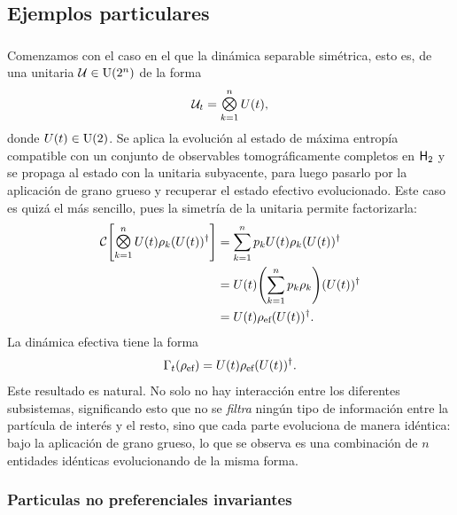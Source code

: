 \subsection{Ejemplos particulares}

\subsubsection{}

Comenzamos con el caso en el que la dinámica separable simétrica, esto es, de una unitaria $\mathcal{U}\in\text{U}(2^{n})$ de la forma
\begin{equation}
    \mcU_{t}=\Motimes_{k=1}^{n}U(t),\nonumber
\end{equation}
donde $U(t)\in\text{U}(2)$. Se aplica la evolución al estado de máxima entropía compatible con un conjunto de observables tomográficamente completos en ${\sf H}_{2}$ y se propaga al estado con la unitaria subyacente, para luego pasarlo por la aplicación de grano grueso y recuperar el estado efectivo evolucionado. Este caso es quizá el más sencillo, pues la simetría de la unitaria permite factorizarla:
\begin{align}
\mcC\qty[\Motimes_{k=1}^{n}U(t) \rho_{k} (U(t))^{\dag}]&=\sum_{k=1}^{n}p_{k} U(t) \rho_{k} (U(t))^{\dag}\nonumber \\
&=U(t)\qty(\sum_{k=1}^{n}p_{k} \rho_{k}) (U(t))^{\dag}\nonumber\\
&=U(t)\rho_{\ef}(U(t))^{\dag}.\nonumber
\end{align}
La dinámica efectiva tiene la forma
\begin{equation}
    \Gamma_{t}(\rho_{\text{ef}})=U(t)\rho_{\text{ef}}(U(t))^{\dag}.\nonumber
\end{equation}
Este resultado es natural. No solo no hay interacción entre los diferentes subsistemas, significando esto que no se \textit{filtra} ningún tipo de información entre la partícula de interés y el resto, sino que cada parte evoluciona de manera idéntica: bajo la aplicación de grano grueso, lo que se observa es una combinación de $n$ entidades idénticas evolucionando de la misma forma.

\subsubsection{Particulas no preferenciales invariantes}

